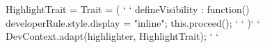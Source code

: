 \vspace{-3.5ex}
\begin{ctxtraits}[numbers=left]
 HighlightTrait = Trait = ({ ` \label{ln:ba-init} `
   defineVisibility : function() {
     developerRule.style.display = "inline";
     this.proceed();  `\label{ln:proceed} `
   }
 })` \label{ln:ba-end} `
 DevContext.adapt(highlighter, HighlightTrait); ` \label{ln:association} `
\end{ctxtraits}
\vspace{-4ex}

\endinput
